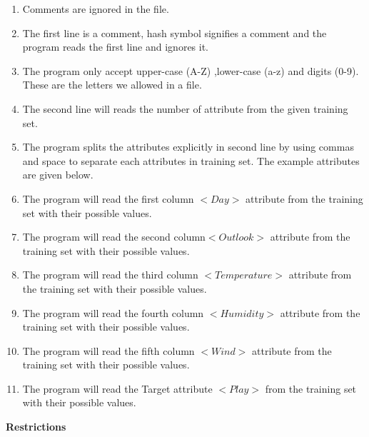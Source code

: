 \documentclass{report}
\begin{document}
\begin{enumerate}



\item Comments are ignored in the file. 
\item The first line is a comment, hash symbol signifies a comment and the program reads the first line and ignores it. 
\item The program only accept upper-case (A-Z) ,lower-case (a-z) and digits (0-9). These are the letters we allowed  in a file.
\item The second line will reads the number of attribute from the given training set.
\item The program splits the attributes explicitly in second line by using commas and space to separate each attributes in training set. The example attributes are given below.
\item The program will read the first column $<Day>$ attribute from the training set with their possible values.
\item The program will read the second column$<Outlook>$ attribute from the training set with their possible values.
\item The program will read the third column $<Temperature>$ attribute from the training set with their possible values.
\item The program will read the fourth column $<Humidity>$ attribute from the training set with their possible values.
\item The program will read the fifth column $<Wind>$ attribute from the training set with their possible values. 
\item The program will read the Target attribute $<Play>$ from the training set with their possible values.

\end{enumerate}

{\bf Restrictions}
\end{document}

